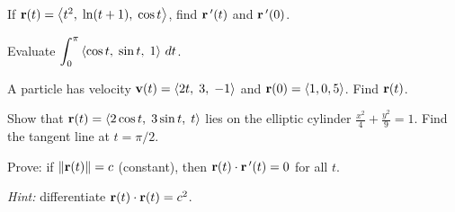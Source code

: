\documentclass[11pt]{article}
\begin{document}
\begin{practice}

\prob If $\mathbf{r}(t) = \left\langle t^2,\; \ln(t+1),\; \cos t \right\rangle$, find $\mathbf{r}\,'(t)$ and $\mathbf{r}\,'(0)$.


\vspace{2.5cm}

\prob Evaluate $\displaystyle\int_0^{\pi} \left\langle \cos t,\; \sin t,\; 1 \right\rangle\,dt$.


\vspace{2.5cm}

\prob A particle has velocity $\mathbf{v}(t) = \left\langle 2t,\; 3,\; -1 \right\rangle$ and $\mathbf{r}(0) = \left\langle 1, 0, 5 \right\rangle$. Find $\mathbf{r}(t)$.


\vspace{3cm}

\prob Show that $\mathbf{r}(t) = \left\langle 2\cos t,\; 3\sin t,\; t \right\rangle$ lies on the elliptic cylinder $\frac{x^2}{4}+\frac{y^2}{9} = 1$. Find the tangent line at $t = \pi/2$.


\vspace{3.5cm}

\prob Prove: if $\|\mathbf{r}(t)\| = c$ (constant), then $\mathbf{r}(t) \cdot \mathbf{r}\,'(t) = 0$ for all $t$.

\textit{Hint:} differentiate $\mathbf{r}(t)\cdot\mathbf{r}(t) = c^2$.


\end{practice}
\end{document}

